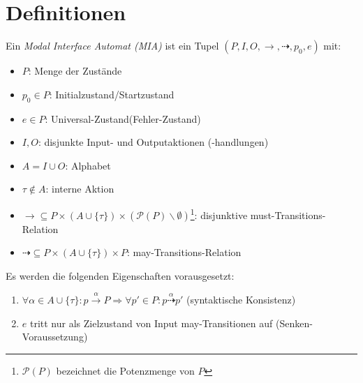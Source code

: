\chapter{Definitionen}
\begin{Def}
  Ein \emph{Modal Interface Automat (MIA)} ist ein Tupel
  $(P,I,O,\longrightarrow,\dashrightarrow,p_0,e)$ mit:
  \begin{itemize}
    \item $P$: Menge der Zustände
    \item $p_0\in P$: Initialzustand/Startzustand 
    \item $e\in P$: Universal-Zustand(Fehler-Zustand) 
    \item $I,O$: disjunkte Input- und Outputaktionen (-handlungen)
    \item $A = I\cup O$: Alphabet
    \item $\tau\notin A$: interne Aktion
    \item $\longrightarrow{} \subseteq P\times (A\cup\{\tau\})\times
      (\mathcal{P}(P)\backslash\emptyset )$\footnote{$\mathcal{P}(P)$
      bezeichnet die Potenzmenge von $P$}: disjunktive
      must-Transitions-Relation
    \item $\dashrightarrow{} \subseteq P\times (A\cup\{\tau\})\times
      P$: may-Transitions-Relation
  \end{itemize}
  Es werden die folgenden Eigenschaften vorausgesetzt:
  \begin{enumerate}
    \item $\forall\alpha\in A\cup\{\tau\}:p\overset{\alpha}{\longrightarrow}P
      \Rightarrow\forall p'\in P:p\overset{\alpha}{\dashrightarrow}p'$
      (syntaktische Konsistenz)
    \item $e$ tritt nur als Zielzustand von Input may-Transitionen auf
      (Senken-Voraussetzung) 
  \end{enumerate}
\end{Def}

